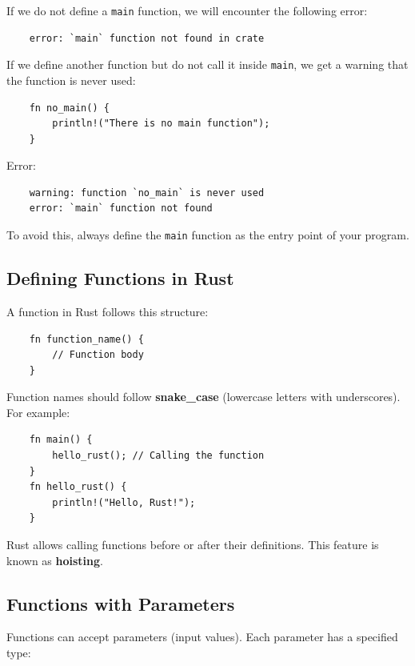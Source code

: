 \documentclass[a4paper,12pt]{report}
\begin{document}
	\noindent If we do not define a \texttt{main} function, we will encounter the following error:

\begin{lstlisting}
	error: `main` function not found in crate
\end{lstlisting}

	\noindent If we define another function but do not call it inside \texttt{main}, we get a warning that the function is never used:

\begin{lstlisting}
	fn no_main() {
		println!("There is no main function");
	}
\end{lstlisting}

	\noindent Error:

\begin{lstlisting}
	warning: function `no_main` is never used
	error: `main` function not found
\end{lstlisting}

	\noindent To avoid this, always define the \texttt{main} function as the entry point of your program.

\subsection*{Defining Functions in Rust}

A function in Rust follows this structure:

\begin{lstlisting}
	fn function_name() {
		// Function body
	}
\end{lstlisting}

	\noindent Function names should follow \textbf{snake\_case} (lowercase letters with underscores). For example:

\begin{lstlisting}
	fn main() {
		hello_rust(); // Calling the function
	}
	fn hello_rust() {
		println!("Hello, Rust!");
	}
\end{lstlisting}

	\noindent Rust allows calling functions before or after their definitions. This feature is known as \textbf{hoisting}.

\subsection*{Functions with Parameters}

Functions can accept parameters (input values). Each parameter has a specified type:
\end{document}
